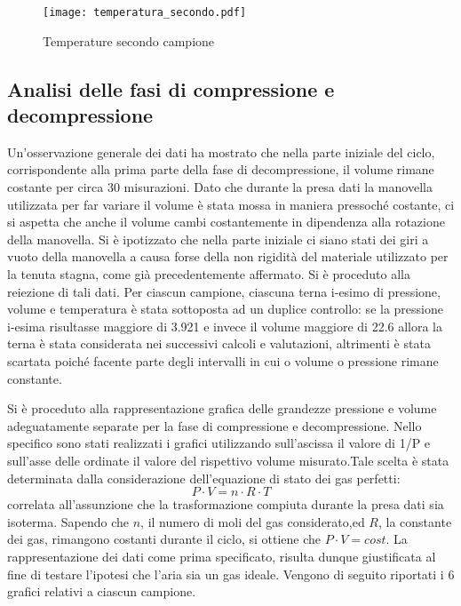 \documentclass[a4paper,11pt,oneside]{article}
\begin{document}
\begin{figure}[h!]
    \centering
    \texttt{[image: temperatura\_secondo.pdf]}
    \caption{Temperature secondo campione}
    \label{fig:campione2}
\end{figure}

\subsection{Analisi delle fasi di compressione e decompressione}
Un'osservazione generale dei dati ha mostrato che nella parte iniziale del ciclo, corrispondente alla prima parte della fase di decompressione, il volume rimane costante per circa 30 misurazioni. Dato che durante la presa dati la manovella utilizzata per far variare il volume è stata mossa in maniera pressoché costante, ci si aspetta che anche il volume cambi costantemente in dipendenza alla rotazione della manovella. Si è ipotizzato che nella parte iniziale ci siano stati dei giri a vuoto della manovella a causa forse della non rigidità del materiale utilizzato per la tenuta stagna, come già precedentemente affermato.
Si è proceduto alla reiezione di tali dati.
Per ciascun campione, ciascuna terna i-esimo di pressione, volume e temperatura è stata sottoposta ad un duplice controllo: se la pressione i-esima risultasse maggiore di 3.921 e invece  il volume maggiore di 22.6 allora la terna è stata considerata nei successivi calcoli e valutazioni, altrimenti è stata scartata poiché facente parte degli intervalli in cui o volume o pressione rimane constante.


Si è proceduto alla rappresentazione grafica delle grandezze pressione e volume adeguatamente separate per la fase di compressione e decompressione. Nello specifico sono stati realizzati i grafici utilizzando sull'ascissa il valore di 1/P e sull'asse delle ordinate il valore del rispettivo volume misurato.Tale scelta è stata determinata dalla considerazione dell'equazione di stato dei gas perfetti:
\begin{equation*}
    P\cdot V = n\cdot R\cdot T
\end{equation*}
correlata all'assunzione che la trasformazione compiuta durante la presa dati sia isoterma. Sapendo che $n$, il numero di moli del gas considerato,ed $R$, la constante dei gas, rimangono costanti durante il ciclo, si ottiene che $P \cdot V = cost$. La rappresentazione dei dati come prima specificato, risulta dunque  giustificata al fine di testare l'ipotesi che l'aria sia un gas ideale.
Vengono di seguito riportati i 6 grafici relativi a ciascun campione.
\end{document}
